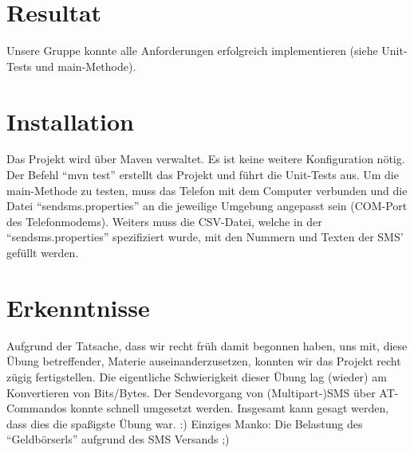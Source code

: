 \documentclass[paper=a4, fontsize=11pt]{scrartcl}
\begin{document}
\section{Resultat}
Unsere Gruppe konnte alle Anforderungen erfolgreich implementieren (siehe Unit-Tests und main-Methode).

\section{Installation}
Das Projekt wird über Maven verwaltet. Es ist keine weitere Konfiguration nötig. Der Befehl "`mvn test"' erstellt das Projekt und führt die Unit-Tests aus. Um die main-Methode zu testen, muss das Telefon mit dem Computer verbunden und die Datei "`sendsms.properties"' an die jeweilige Umgebung angepasst sein (COM-Port des Telefonmodems). Weiters muss die CSV-Datei, welche in der "`sendsms.properties"' spezifiziert wurde, mit den Nummern und Texten der SMS' gefüllt werden.

\section{Erkenntnisse}
Aufgrund der Tatsache, dass wir recht früh damit begonnen haben, uns mit, diese Übung betreffender, Materie auseinanderzusetzen, konnten wir das Projekt recht zügig fertigstellen. Die eigentliche Schwierigkeit dieser Übung lag (wieder) am Konvertieren von Bits/Bytes. Der Sendevorgang von (Multipart-)SMS über AT-Commandos konnte schnell umgesetzt werden. Insgesamt kann gesagt werden, dass dies die spaßigste Übung war. :) Einziges Manko: Die Belastung des "`Geldbörserls"' aufgrund des SMS Versands ;)
\end{document}

